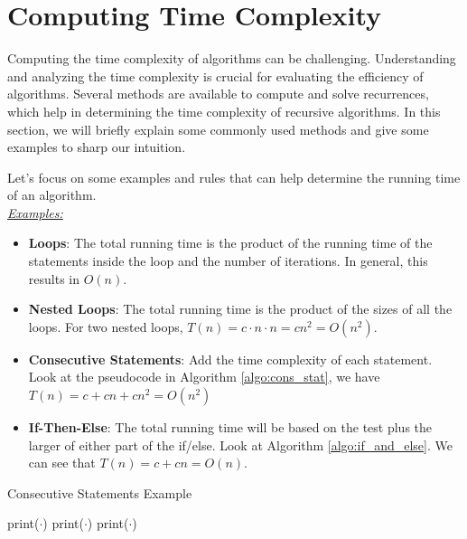 \documentclass[a4paper,10pt]{article}
\begin{document}
\section{Computing Time Complexity}

Computing the time complexity of algorithms can be challenging. Understanding and analyzing the time complexity is crucial for evaluating the efficiency of algorithms. Several methods are available to compute and solve recurrences, which help in determining the time complexity of recursive algorithms. In this section, we will briefly explain some commonly used methods and give some examples to sharp our intuition.

Let's focus on some examples and rules that can help determine the running time of an algorithm.\\

\underline{\textit{Examples:}}

\begin{itemize}
    \item \textbf{Loops}: The total running time is the product of the running time of the statements inside the loop and the number of iterations. In general, this results in $O(n)$.

    \item \textbf{Nested Loops}: The total running time is the product of the sizes of all the loops. For two nested loops, $T(n) = c \cdot n \cdot n = cn^2 = O(n^2)$.

    \item \textbf{Consecutive Statements}: Add the time complexity of each statement. Look at the pseudocode in Algorithm \ref{algo:cons_stat}, we have $T(n) = c + cn + cn^2 = O(n^2)$

    \item \textbf{If-Then-Else}: The total running time will be based on the test plus the larger of either part of the if/else. Look at Algorithm \ref{algo:if_and_else}. We can see that $T(n) = c + cn = O(n)$.
\end{itemize}

\begin{algorithm}
    \caption{Consecutive Statements Example}
    \begin{algorithmic}[1]
        \State print($\cdot$) 
            \State print($\cdot$) 
                    \State print($\cdot$) 
                \EndFor
            \EndFor
        \EndFor
    \end{algorithmic}
    \label{algo:cons_stat}
\end{algorithm}
\end{document}
